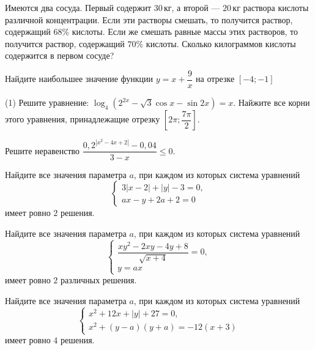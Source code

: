 \begin{homework}[number=1]
	\begin{listofex}
		\item Имеются два сосуда. Первый содержит \( 30 \) кг, а второй --- \( 20 \) кг раствора кислоты различной концентрации. Если эти растворы смешать, то получится раствор, содержащий \( 68\% \) кислоты. Если же смешать равные массы этих растворов, то получится раствор, содержащий \( 70\% \) кислоты. Сколько килограммов кислоты содержится в первом сосуде?
		\item Найдите наибольшее значение функции \( y=x+\dfrac{9}{x} \) на отрезке \( [-4; -1] \)
		\item 
		\begin{tasks}(1)
			\task Решите уравнение: \( \log_4\left( 2^{2x}-\sqrt{3}\cos x-\sin2x \right)=x \).
			\task Найжите все корни этого уравнения, принадлежащие отрезку \( \left[ 2\pi; \dfrac{7\pi}{2} \right]  \).
		\end{tasks}
		\item Решите неравенство \( \dfrac{0,2^{|x^2-4x+2|}-0,04}{3-x}\le0 \).
		\item Найдите все значения параметра \( a \), при каждом из которых система уравнений
		\[ \begin{cases}
			3|x-2|+|y|-3=0,\\
			ax-y+2a+2=0
		\end{cases} \]
		имеет ровно \( 2 \) решения.
		\item Найдите все значения параметра \( a \), при каждом из которых система уравнений
		\[ \begin{cases}
			\dfrac{xy^2-2xy-4y+8}{\sqrt{x+4}}=0,\\
			y=ax
		\end{cases} \]
		имеет ровно \( 2 \) различных решения.
		\item Найдите все значения параметра \( a \), при каждом из которых система уравнений
		\[ \begin{cases}
			x^2+12x+|y|+27=0,\\
			x^2+(y-a)(y+a)=-12(x+3)
		\end{cases} \]
		имеет ровно \( 4 \) решения.
	\end{listofex}
\end{homework}

